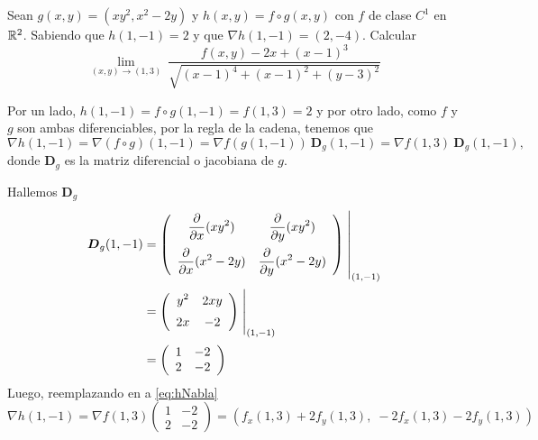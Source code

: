 \begin{solution}
    Sean $g(x,y)=(xy^2,x^2-2y)$ y $h(x,y)=f \circ g(x,y)$ con $f$ de clase $C^1$ en $\mathbb{R}^2$. Sabiendo que $h(1,-1)=2$ y que $\nabla h(1,-1)=(2,-4)$. Calcular
    \[
        \lim_{(x,y)\to (1,3)} \ 
        \frac{f(x,y)-2x+(x-1)^3}{\sqrt{(x-1)^4+(x-1)^2+(y-3)^2}}       
    \]

 Por un lado,      $h(1,-1)= f\circ g (1,-1) =  f(1,3)=2$  y por otro lado,  como $f$ y $g$ son ambas diferenciables,  por la regla de la cadena,  tenemos que
    \begin{equation}
        \nabla h(1,-1)=\nabla (f\circ g)(1,-1)=\nabla f(g(1,-1)) \:\boldsymbol{D}_g(1,-1) = \nabla f (1,3) \:\boldsymbol{D}_g(1,-1),  \label{eq:hNabla}
    \end{equation}    donde $\boldsymbol{D}_g$ es la matriz diferencial o  jacobiana de $g$.

    
    \noindent  Hallemos $\boldsymbol{D}_g$
    \begin{align*}
        \boldsymbol{D}_g(1,-1) & =
        \left(\begin{array}{cc}
                      \displaystyle\partialx (xy^2)            & \displaystyle\partialy (xy^2)           \\[10pt]
                      \displaystyle\partialx  (x^2 -2y) & \displaystyle\partialy (x^2 -2y)
                  \end{array}\right)\left.\rule{0pt}{1.1cm}\right\rvert_{(1,-1)}             \\[2pt]
                              & =\left(\begin{array}{cc}
                                               \displaystyle y^2                 & \displaystyle 2xy              \\[5pt]
                                               \displaystyle   2x & \displaystyle -2
                                           \end{array}\right)\left.\rule{0pt}{0.7cm}\right\rvert_{(1,-1)} \\[2pt]
                              & =\left(\begin{array}{cc}
                                               1    & -2    \\
                                               2 & -2
                                           \end{array}\right)
    \end{align*}
    Luego, reemplazando en  a   \eqref{eq:hNabla}
    \[
        \nabla h(1,-1) = \nabla f(1,3)\left(\begin{array}{cc}
                1   & -2    \\
                2 & -2
            \end{array}\right) = \left(f_x(1,3) + 2f_y(1,3),\;-2f_x(1,3)-2f_y(1,3)\right)
    \]


\end{solution}
